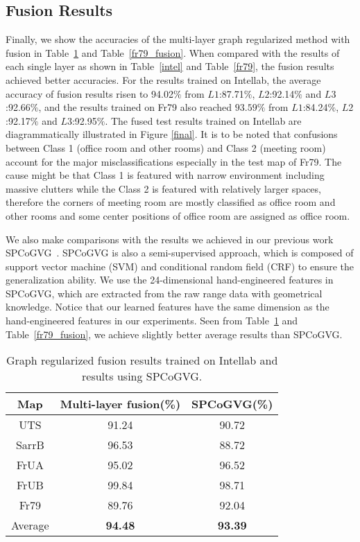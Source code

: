 \documentclass[letterpaper, 10 pt, conference]{ieeeconf}  %
\begin{document}
\subsection{Fusion Results}
Finally, we show the accuracies of the multi-layer graph regularized method with fusion in Table~\ref{intel_fusion} and Table~\ref{fr79_fusion}. When compared with the results of each single layer as shown in Table~\ref{intel} and Table~\ref{fr79}, the fusion results achieved better accuracies. For the results trained on Intellab, the average accuracy of fusion results risen to 94.02$\%$ from  $L1$:87.71$\%$, $L2$:92.14$\%$ and $L3$:92.66$\%$, and the results trained on Fr79 also reached $93.59\%$ from $L1$:84.24$\%$, $L2$:92.17$\%$ and $L3$:92.95$\%$. The fused test results trained on Intellab are diagrammatically illustrated in Figure \ref{final}. It is to be noted that confusions between Class 1 (office room and other rooms) and Class 2 (meeting room) account for the major misclassifications especially in the test map of Fr79. The cause might be that Class 1 is featured with narrow environment including massive clutters while the Class 2 is featured with relatively larger spaces, therefore the corners of meeting room are mostly classified as office room and other rooms and some center positions of office room are assigned as office room.

We also make comparisons with the results we achieved in our previous work SPCoGVG~\cite{shi2013towards}. SPCoGVG is also a semi-supervised approach, which is composed of support vector machine (SVM) and conditional random field (CRF) to ensure the generalization ability. We use the 24-dimensional hand-engineered features in SPCoGVG, which are extracted from the raw range data with geometrical knowledge. Notice that our learned features have the same dimension as the hand-engineered features in our experiments. Seen from Table~\ref{intel_fusion} and Table~\ref{fr79_fusion}, we achieve slightly better average results than SPCoGVG.
\begin{table}[tpb]
\caption{Graph regularized fusion results trained on Intellab and results using SPCoGVG.}
\label{intel_fusion}
\begin{center}
\begin{tabular}{ccc}
Map     &Multi-layer fusion(\%)     &SPCoGVG(\%)        \\
\hline
UTS     &91.24	    &90.72	    \\
SarrB   &96.53	    &88.72      \\
FrUA    &95.02	    &96.52	    \\
FrUB    &99.84	    &98.71	    \\
Fr79    &89.76	    &92.04	    \\
Average     &\textbf{94.48}	    &\textbf{93.39}	    \\
\end{tabular}
\end{center}
\end{table}
\end{document}
